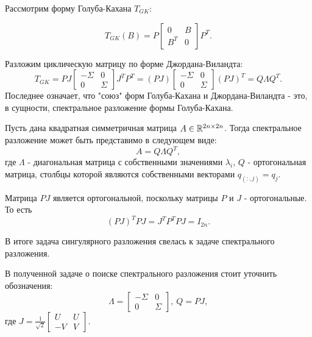 Рассмотрим  форму Голуба-Кахана \(T_{GK}\):

\begin{equation}
T_{GK} (B) = P \begin{bmatrix} 0 & B \\ B^T & 0 \end{bmatrix} P^T .
\end{equation}

Разложим циклическую матрицу по форме Джордана-Виландта:
\begin{equation}
T_{GK} = P J\begin{bmatrix} -\Sigma & 0 \\ 0 & \Sigma \end{bmatrix}J^T P^T = (PJ) \begin{bmatrix} -\Sigma & 0 \\ 0 & \Sigma \end{bmatrix} (PJ)^T=Q\Lambda Q^T.
\end{equation}
Последнее означает, что "союз" форм Голуба-Кахана и Джордана-Виландта - это, в сущности, спектральное разложение формы Голуба-Кахана.

\begin{note}
    Пусть дана квадратная симметричная матрица \(A \in \mathbb{R}^{2n \times 2n}\). 
    Тогда спектральное разложение может быть представимо в следующем виде:
    \[
     A=Q\Lambda Q^T,
    \]
    где \(\Lambda\) - диагональная матрица с собственными значениями \(\lambda_i\), \(Q\) - ортогональная матрица, столбцы которой являются собственными векторами \(q_{(:,j)}=q_j\). 
\end{note}

\begin{note}
    Матрица \(PJ\) является ортогональной, поскольку матрицы \(P\) и \(J\) - ортогональные. То есть 
    \[(PJ)^TPJ=J^TP^TPJ=I_{2n}.\]
\end{note}

В итоге задача сингулярного разложения свелась к задаче спектрального разложения. 

\begin{note}
    В полученной задаче о поиске спектрального разложения стоит уточнить обозначения:
    \[
    \Lambda = \begin{bmatrix} -\Sigma & 0 \\ 0 & \Sigma \end{bmatrix}, \ Q= PJ,
    \]
    где \(J= \frac{1}{\sqrt{2}}\begin{bmatrix}
    U & U \\
    -V & V
\end{bmatrix}\).
\end{note}

